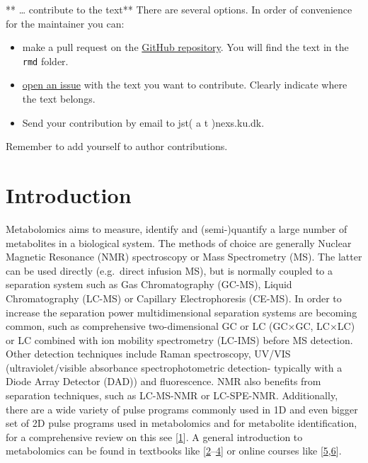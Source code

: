 \documentclass[]{article}
\providecommand{\tightlist}{%
  \setlength{\itemsep}{0pt}\setlength{\parskip}{0pt}}
\begin{document}
** \ldots{} contribute to the text**
There are several options. In order of convenience for the maintainer you can:

\begin{itemize}
\tightlist
\item
  make a pull request on the \href{https://github.com/rformassspectrometry/metaRbolomics-book}{GitHub repository}. You will find the text in the \texttt{rmd} folder.
\item
  \href{https://github.com/rformassspectrometry/metaRbolomics-book/issues}{open an issue} with the text you want to contribute. Clearly indicate where the text belongs.
\item
  Send your contribution by email to jst( a t )nexs.ku.dk.
\end{itemize}

Remember to add yourself to author contributions.

\newpage

\hypertarget{introduction}{%
\section{Introduction}\label{introduction}}

Metabolomics aims to measure, identify and (semi-)quantify a large number of metabolites in a biological system. The methods of choice are generally Nuclear Magnetic Resonance (NMR) spectroscopy or Mass Spectrometry (MS). The latter can be used directly (e.g.~direct infusion MS), but is normally coupled to a separation system such as Gas Chromatography (GC-MS), Liquid Chromatography (LC-MS) or Capillary Electrophoresis (CE-MS). In order to increase the separation power multidimensional separation systems are becoming common, such as comprehensive two-dimensional GC or LC (GC×GC, LC×LC) or LC combined with ion mobility spectrometry (LC-IMS) before MS detection. Other detection techniques include Raman spectroscopy, UV/VIS (ultraviolet/visible absorbance spectrophotometric detection- typically with a Diode Array Detector (DAD)) and fluorescence. NMR also benefits from separation techniques, such as LC-MS-NMR or LC-SPE-NMR. Additionally, there are a wide variety of pulse programs commonly used in 1D and even bigger set of 2D pulse programs used in metabolomics and for metabolite identification, for a comprehensive review on this see {[}\protect\hyperlink{ref-emwas_2019}{1}{]}. A general introduction to metabolomics can be found in textbooks like {[}\protect\hyperlink{ref-lammerhofer_2013}{2}--\protect\hyperlink{ref-wehrens_2019}{4}{]} or online courses like {[}\protect\hyperlink{ref-InternationalMetabolomicsSociety_2019}{5},\protect\hyperlink{ref-salek_website_nd}{6}{]}.
\end{document}
